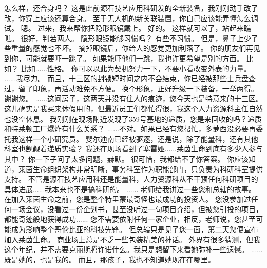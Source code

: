 \documentclass[openany]{book}
\begin{document}
\begin{dialogue}
     怎么样，还合身吗？
     这是此前源石技艺应用科研发的全新装备，我刚刚动手改了改，你穿上应该还算合身。
     至于无人机的新关联装置，你自己应该能弄懂怎么调试。
     嗯。
     过来，我来帮你把隐形眼镜戴上。
     好的。
     这样就可以了，站起来瞧瞧。
     很好，判若两人。
     隐形眼镜能够习惯吗？
     有些不习惯。
     但是，鼻子上少了些重量的感觉也不坏。
     摘掉眼镜后，你给人的感觉更加利落了。
     你的朋友们再见到你，可能就要吓一跳了。
     如果能吓他们一跳，我也许更希望是别的方面。
     比如？
     比如......性格。
     你可以以此为契机努力一下，不要小看改变外表的力量。
     ......我尽力。
     而且，十三区的封锁短时间之内不会结束，你已经被那些士兵盘查过，留了印象，再活动难免不方便。
     换个形象，正好升级一下装备，一举两得。
     谢谢您。
     ......这间房子，这两天并没有住人的痕迹，您今天也是特意来的十三区。
     这儿确实是我买来休假用的，但最近员工们都忙得很，我这个人力资源科主任自然也没空休息。
     我刚刚在现场附近发现了359号基地的递质，您是来回收的吗？递质和特莱顿工厂爆炸有什么关系？
     ......不对。如果已经有您帮忙，多萝西没必要再委托我这样一个小研究员。
     斐尔迪南已经被驱逐，还是说，除了能量科，还有其他科室也觊觎着递质实验？
     我还在现场看到了塞雷娅......莱茵生命到底有多少人参与其中？
     你一下子问了太多问题，赫默。
     很可惜，我都给不了你答案。
     你应该知道，莱茵生命组织架构非常明晰，事务科室作为职能部门，只负责为科研科室提供支持。
     不管是源石技艺应用科还是能量科，人力资源科从不干预任何科研项目的具体进展......我本来也不是搞科研的。
     ......
     老师给我讲过一些您和总辖的故事。
     在加入莱茵生命之前，您是整个特里蒙最奇怪也最成功的投资人。
     您没参加过任何一场会议，没看过一份企划书，甚至没听过一句项目介绍，但被您引投的项目，都能奇迹般地获得成功......
     您不需要依附任何一家企业，相反，老师说，您甚至可能成为影响整个哥伦比亚的科技先锋。
     但总辖只是见了您一面，第二天您便宣布加入莱茵生命。
     商业场上总是不乏一些包装精美的神话。
     外界有很多猜测，但我这个年纪，并不需要克丽斯腾许诺什么。我只是想留下来看她弥补一些遗憾。
     ......既是她的，也是我的。
     而且，那孩子，我也不知道她现在在哪里。

\end{dialogue}
\end{document}
